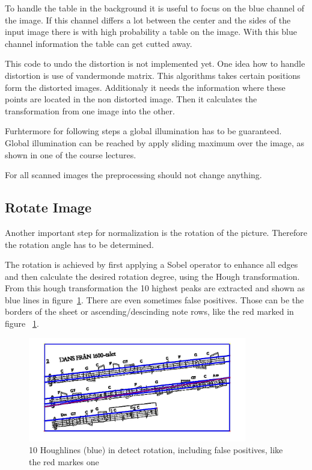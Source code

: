 To handle the table in the background it is useful to focus on the blue channel of the image. If this channel differs a lot between the center and the sides of the input image there is with high probability a table on the image. With this blue channel information the table can get cutted away.

This code to undo the distortion is not implemented yet. One idea how to handle distortion is use of vandermonde matrix. This algorithms takes certain positions form the distorted images. Additionaly it needs the information where these points are located in the non distorted image. Then it calculates the transformation from one image into the other.

Furhtermore for following steps a global illumination has to be guaranteed. Global illumination can be reached by apply sliding maximum over the image, as shown in one of the course lectures.


For all scanned images the preprocessing should not change anything. 
\subsection{Rotate Image}

Another important step for normalization is the rotation of the picture. Therefore the rotation angle has to be determined. 

The rotation is achieved by first applying a Sobel operator to enhance all edges and then calculate the desired rotation degree, using the Hough transformation.
From this hough transformation the 10 highest peaks are extracted and shown as blue lines in figure~\ref{fig:falsePositives}. There are even sometimes false positives. Those can be the borders of the sheet or ascending/descinding note rows, like the red marked in figure ~\ref{fig:falsePositives}.

\begin{figure}[htbp]
    \centering
		\includegraphics[width=0.85\textwidth]{detectRot1.jpg}
		\caption[10 Houghlines (blue) in detect rotation]{10 Houghlines (blue) in detect rotation, including false positives, like the red markes one\label{fig:falsePositives}}
\end{figure}

